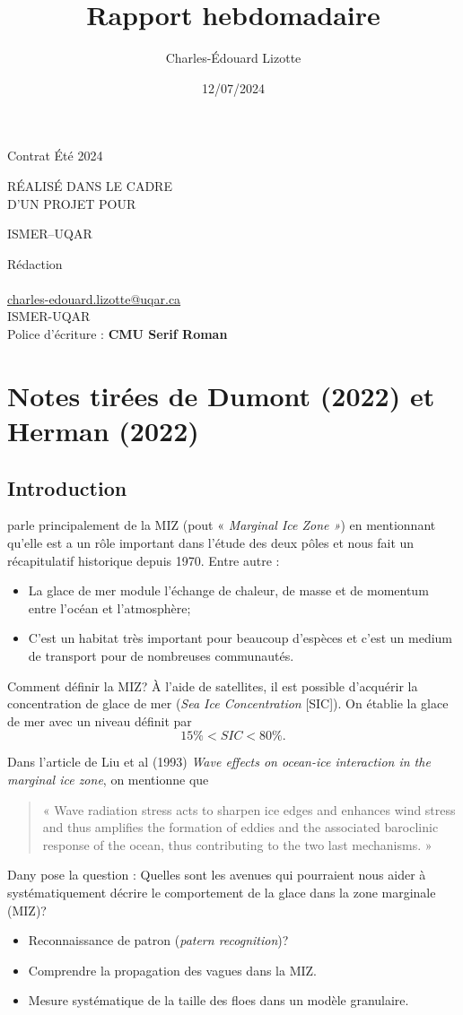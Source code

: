 \documentclass[10pt]{article}
\author{Charles-Édouard Lizotte}
\date{12/07/2024}
\title{Rapport hebdomadaire}
\makeatletter
\numberwithin{equation}{section}
\newcommand{\mytitlepage}{
\begin{titlepage}
\begin{center}
{\Huge \thesubtitle \par}
\vspace{2cm}
{\Huge \MakeUppercase{\thetitle} \par}
\vspace{2cm}
RÉALISÉ DANS LE CADRE\\ D'UN PROJET POUR \par
\vspace{2cm}
{\Huge ISMER--UQAR \par}
\vspace{2cm}
{\thedate}
\end{center}
\vfill
Rédaction \\
{\theauthor}\\
\url{charles-edouard.lizotte@uqar.ca}\\
ISMER-UQAR\\
Police d'écriture : \textbf{CMU Serif Roman}
\end{titlepage}
}
\newcommand{\thesubtitle}{Contrat Été 2024}
\makeatother
\begin{document}
\mytitlepage
\tableofcontents\newpage

\section{Notes tirées de Dumont (2022) et Herman (2022)}
\label{sec:org09a975c}

\subsection{Introduction}
\label{sec:org756b479}

\Textcite{dumont2022marginal} parle principalement de la MIZ (pout « \emph{Marginal Ice Zone »}) en mentionnant qu'elle est a un rôle important dans l'étude des deux pôles et nous fait un récapitulatif historique depuis 1970.
Entre autre : 
\begin{itemize}
\item La glace de mer module l'échange de chaleur, de masse et de momentum entre l'océan et l'atmosphère;
\item C'est un habitat très important pour beaucoup d'espèces et c'est un medium de transport pour de nombreuses communautés.
\end{itemize}

Comment définir la MIZ?
À l'aide de satellites, il est possible d'acquérir la concentration de glace de mer (\emph{Sea Ice Concentration} [SIC]).
On établie la glace de mer avec un niveau définit par
\begin{equation}
   15\% < SIC < 80\%. 
\end{equation}

Dans l'article de Liu et al (1993) \emph{Wave effects on ocean-ice interaction in the marginal ice
zone}, on mentionne que
\begin{quote}
« Wave radiation stress acts to sharpen ice edges and enhances wind stress and thus amplifies the formation of eddies and the associated baroclinic response of the ocean, thus contributing to the two last mechanisms. »
\end{quote}

Dany pose la question : Quelles sont les avenues qui pourraient nous aider à systématiquement décrire le comportement de la glace dans la zone marginale (MIZ)?
\begin{itemize}
\item Reconnaissance de patron (\emph{patern recognition})?
\item Comprendre la propagation des vagues dans la MIZ.
\item Mesure systématique de la taille des floes dans un modèle granulaire.
\end{itemize}
\end{document}
